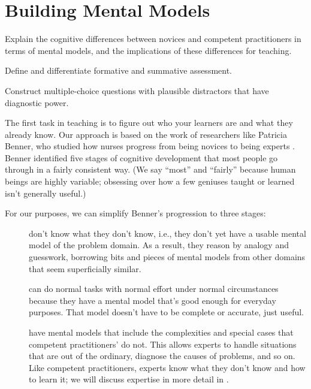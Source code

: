 \chapter{Building Mental Models}\label{s:models}

\begin{objectives}

\item
  Explain the cognitive differences between novices and competent
  practitioners in terms of mental models, and the implications of
  these differences for teaching.

\item
  Define and differentiate formative and summative assessment.

\item
  Construct multiple-choice questions with plausible distractors that
  have diagnostic power.

\end{objectives}

The first task in teaching is to figure out who your learners are and
what they already know.  Our approach is based on the work of
researchers like Patricia Benner, who studied how nurses progress from
being novices to being experts \cite{Benn2000}. Benner identified five
stages of cognitive development that most people go through in a
fairly consistent way. (We say ``most'' and ``fairly'' because human
beings are highly variable; obsessing over how a few geniuses taught
or learned isn't generally useful.)

For our purposes, we can simplify Benner's progression to three
stages:

\begin{description}

  \item[] don't know what they don't know,
    i.e., they don't yet have a usable mental model of the problem
    domain.  As a result, they reason by analogy and guesswork,
    borrowing bits and pieces of mental models from other domains that
    seem superficially similar.

  \item[]
    can do normal tasks with normal effort under normal circumstances
    because they have a mental model that's good enough for everyday
    purposes.  That model doesn't have to be complete or accurate,
    just useful.

  \item[] have mental models that include
    the complexities and special cases that competent practitioners'
    do not.  This allows experts to handle situations that are out of
    the ordinary, diagnose the causes of problems, and so on.  Like
    competent practitioners, experts know what they don't know and how
    to learn it; we will discuss expertise in more detail in
    .

\end{description}

